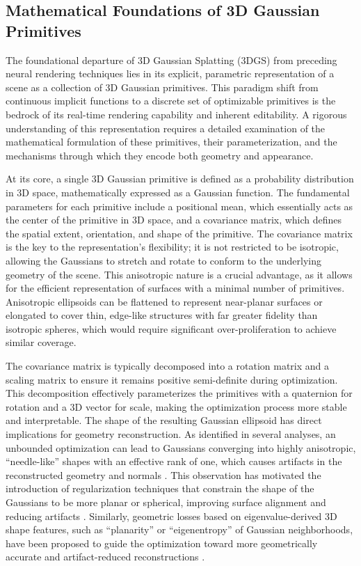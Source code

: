 \documentclass[11pt]{article}
\begin{document}
\subsection{Mathematical Foundations of 3D Gaussian Primitives}

The foundational departure of 3D Gaussian Splatting (3DGS) from preceding neural rendering techniques lies in its explicit, parametric representation of a scene as a collection of 3D Gaussian primitives. This paradigm shift from continuous implicit functions to a discrete set of optimizable primitives is the bedrock of its real-time rendering capability and inherent editability. A rigorous understanding of this representation requires a detailed examination of the mathematical formulation of these primitives, their parameterization, and the mechanisms through which they encode both geometry and appearance.

At its core, a single 3D Gaussian primitive is defined as a probability distribution in 3D space, mathematically expressed as a Gaussian function. The fundamental parameters for each primitive include a positional mean, which essentially acts as the center of the primitive in 3D space, and a covariance matrix, which defines the spatial extent, orientation, and shape of the primitive. The covariance matrix is the key to the representation's flexibility; it is not restricted to be isotropic, allowing the Gaussians to stretch and rotate to conform to the underlying geometry of the scene. This anisotropic nature is a crucial advantage, as it allows for the efficient representation of surfaces with a minimal number of primitives. Anisotropic ellipsoids can be flattened to represent near-planar surfaces or elongated to cover thin, edge-like structures with far greater fidelity than isotropic spheres, which would require significant over-proliferation to achieve similar coverage.

The covariance matrix is typically decomposed into a rotation matrix and a scaling matrix to ensure it remains positive semi-definite during optimization. This decomposition effectively parameterizes the primitives with a quaternion for rotation and a 3D vector for scale, making the optimization process more stable and interpretable. The shape of the resulting Gaussian ellipsoid has direct implications for geometry reconstruction. As identified in several analyses, an unbounded optimization can lead to Gaussians converging into highly anisotropic, ``needle-like'' shapes with an effective rank of one, which causes artifacts in the reconstructed geometry and normals \cite{ref9}. This observation has motivated the introduction of regularization techniques that constrain the shape of the Gaussians to be more planar or spherical, improving surface alignment and reducing artifacts \cite{ref9}. Similarly, geometric losses based on eigenvalue-derived 3D shape features, such as ``planarity'' or ``eigenentropy'' of Gaussian neighborhoods, have been proposed to guide the optimization toward more geometrically accurate and artifact-reduced reconstructions \cite{ref10,ref11}.
\end{document}
